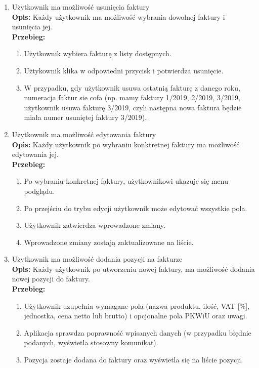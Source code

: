 \begin{enumerate}
    \item Użytkownik ma możliwość usunięcia faktury\\
    \textbf{Opis: } Każdy użytkownik ma możliwość wybrania dowolnej faktury i usunięcia jej.\\
    \textbf{Przebieg: } 
    \begin{enumerate}
        \item Użytkownik wybiera fakturę z listy dostępnych.
        \item Użtykownik klika w odpowiedni przycisk i potwierdza usunięcie.
        \item W przypadku, gdy użytkownik usuwa ostatnią fakturę z danego roku, numeracja faktur sie cofa (np. mamy faktury 1/2019, 2/2019, 3/2019, użytkownik usuwa fakturę 3/2019, czyli następna nowa faktura będzie miała numer usuniętej faktury 3/2019).\\
    \end{enumerate}
    
    \item Użytkownik ma możliwość edytowania faktury\\
    \textbf{Opis: } Każdy użytkownik po wybraniu konktretnej faktury ma możliwość edytowania jej.\\
    \textbf{Przebieg: }
    \begin{enumerate}
        \item Po wybraniu konkretnej faktury, użytkownikowi ukazuje się menu podglądu.
        \item Po przejściu do trybu edycji użytkownik może edytować wszystkie pola.
        \item Użytkownik zatwierdza wprowadzone zmiany.
        \item Wprowadzone zmiany zostają zaktualizowane na liście.\\
    \end{enumerate}
    
        \item Użytkownik ma możliwość dodania pozycji na fakturze \\
    \textbf{Opis: } Każdy użytkownik po utworzeniu nowej faktury, ma możliwość dodania nowej pozycji do faktury.\\
    \textbf{Przebieg: }
    \begin{enumerate}
        \item Użytkownik uzupełnia wymagane pola (nazwa produktu, ilość, VAT [\%], jednostka, cena netto lub brutto) i opcjonalne pola PKWiU oraz uwagi.
        \item Aplikacja sprawdza poprawność wpisanych danych (w przypadku błędnie podanych, wyświetla stosowny komunikat).
        \item Pozycja zostaje dodana do faktury oraz wyświetla się na liście pozycji.
    \end{enumerate}
    

\end{enumerate}
